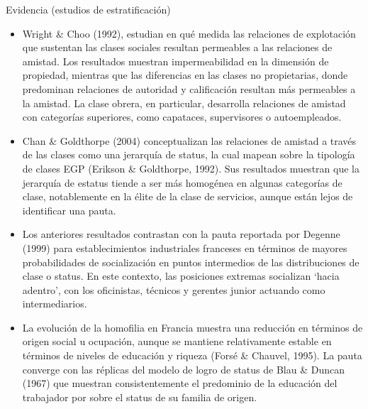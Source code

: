 \documentclass[
  8pt,
  ignorenonframetext,
]{beamer}
\begin{document}
\begin{frame}{Evidencia (estudios de estratificación)}
\protect\hypertarget{evidencia-estudios-de-estratificaciuxf3n}{}
\begin{itemize}
\item
  Wright \& Choo (1992), estudian en qué medida las relaciones de
  explotación que sustentan las clases sociales resultan permeables a
  las relaciones de amistad. Los resultados muestran impermeabilidad en
  la dimensión de propiedad, mientras que las diferencias en las clases
  no propietarias, donde predominan relaciones de autoridad y
  calificación resultan más permeables a la amistad. La clase obrera, en
  particular, desarrolla relaciones de amistad con categorías
  superiores, como capataces, supervisores o autoempleados.
\item
  Chan \& Goldthorpe (2004) conceptualizan las relaciones de amistad a
  través de las clases como una jerarquía de status, la cual mapean
  sobre la tipología de clases EGP (Erikson \& Goldthorpe, 1992). Sus
  resultados muestran que la jerarquía de estatus tiende a ser más
  homogénea en algunas categorías de clase, notablemente en la élite de
  la clase de servicios, aunque están lejos de identificar una pauta.
\item
  Los anteriores resultados contrastan con la pauta reportada por
  Degenne (1999) para establecimientos industriales franceses en
  términos de mayores probabilidades de socialización en puntos
  intermedios de las distribuciones de clase o status. En este contexto,
  las posiciones extremas socializan `hacia adentro', con los
  oficinistas, técnicos y gerentes junior actuando como intermediarios.
\item
  La evolución de la homofilia en Francia muestra una reducción en
  términos de origen social u ocupación, aunque se mantiene
  relativamente estable en términos de niveles de educación y riqueza
  (Forsé \& Chauvel, 1995). La pauta converge con las réplicas del
  modelo de logro de status de Blau \& Duncan (1967) que muestran
  consistentemente el predominio de la educación del trabajador por
  sobre el status de su familia de origen.
\end{itemize}
\end{frame}
\end{document}
